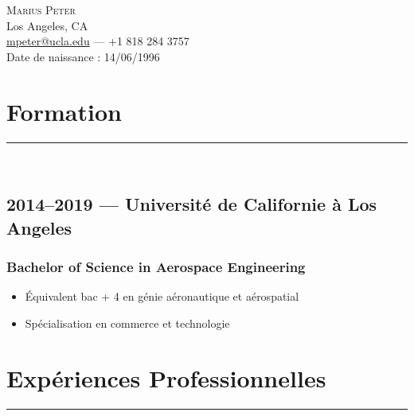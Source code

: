 \documentclass[10pt]{article}
\begin{document}
\renewcommand\labelitemi{-}
\begin{center}
    \huge \textsc{Marius Peter}\\[0.2cm]

    \normalsize
    Los Angeles, CA\\
    \href{mailto:mpeter@ucla.edu}{mpeter@ucla.edu} --- +1 818 284 3757\\[0.1cm]
    Date de naissance : 14/06/1996\\[1cm]
\end{center}


\section*{Formation}
\rule{\linewidth}{1pt}\\
\subsection*{2014--2019 --- Université de Californie à Los Angeles}
\subsubsection*{Bachelor of Science in Aerospace Engineering}
\begin{itemize}
    \item Équivalent bac + 4 en génie aéronautique et aérospatial
    \item Spécialisation en commerce et technologie
\end{itemize}

\section*{Expériences Professionnelles}
\rule{\linewidth}{1pt}\\
\end{document}
